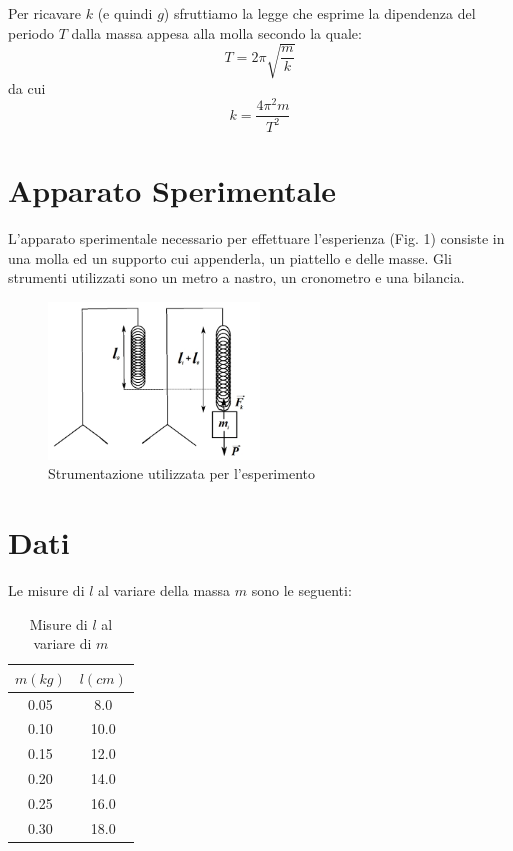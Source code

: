 \documentclass{article}
\begin{document}
    Per ricavare $k$ (e quindi $g$) sfruttiamo la legge che esprime la dipendenza del periodo $T$ dalla massa appesa alla molla secondo la quale:
    \[
    T = 2\pi \sqrt{\frac{m}{k}}
    \]
    da cui
    \[
    k = \frac{4\pi^2 m}{T^2}
    \]

    \section{Apparato Sperimentale}
    L’apparato sperimentale necessario per effettuare l’esperienza (Fig. 1) consiste in una molla ed un supporto cui appenderla, un piattello e delle masse. Gli strumenti utilizzati sono un metro a nastro, un cronometro e una bilancia.

    \begin{figure}[H]
        \centering
        \includegraphics[width=0.5\textwidth]{fig1.jpg}
        \caption{Strumentazione utilizzata per l’esperimento}
        \label{fig:apparato}
    \end{figure}

    \section{Dati}
    Le misure di $l$ al variare della massa $m$ sono le seguenti:

    \begin{table}[H]
        \centering
        \begin{tabular}{|c|c|}
            \hline
            $m (kg)$ & $l (cm)$ \\
            \hline
            0.05 & 8.0 \\
            0.10 & 10.0 \\
            0.15 & 12.0 \\
            0.20 & 14.0 \\
            0.25 & 16.0 \\
            0.30 & 18.0 \\
            \hline
        \end{tabular}
        \caption{Misure di $l$ al variare di $m$}
        \label{tab:misure}
    \end{table}
\end{document}

